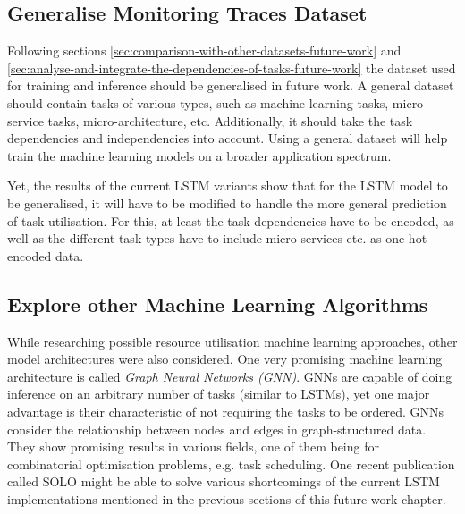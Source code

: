         \subsection{Generalise Monitoring Traces Dataset}
        \label{sec:generalise-dataset-future-work}

            Following sections \ref{sec:comparison-with-other-datasets-future-work} and \ref{sec:analyse-and-integrate-the-dependencies-of-tasks-future-work} the dataset used for training and inference should be generalised in future work. 
            A general dataset should contain tasks of various types, such as machine learning tasks, micro-service tasks, micro-architecture, etc.
            Additionally, it should take the task dependencies and independencies into account.
            Using a general dataset will help train the machine learning models on a broader application spectrum.

            Yet, the results of the current LSTM variants show that for the LSTM model to be generalised, it will have to be modified to handle the more general prediction of task utilisation. For this, at least the task dependencies have to be encoded, as well as the different task types have to include micro-services etc. as one-hot encoded data.
            
            

        \subsection{Explore other Machine Learning Algorithms}
        \label{sec:explore-other-machine-learning-algorithms-future-work}

            While researching possible resource utilisation machine learning approaches, other model architectures were also considered.
            One very promising machine learning architecture is called \emph{Graph Neural Networks (GNN)}.
            GNNs are capable of doing inference on an arbitrary number of tasks (similar to LSTMs), yet one major advantage is their characteristic of not requiring the tasks to be ordered. GNNs consider the relationship between nodes and edges in graph-structured data.
            They show promising results in various fields, one of them being for combinatorial optimisation problems, e.g. task scheduling.
            One recent publication called SOLO \cite{orenSOLOSearchOnline2021} might be able to solve various shortcomings of the current LSTM implementations mentioned in the previous sections of this future work chapter.

